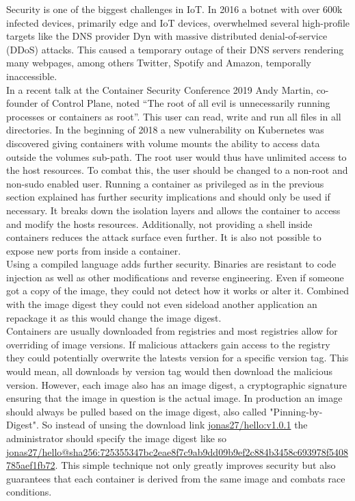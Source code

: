 Security is one of the biggest challenges in IoT. In 2016 a botnet with over 600k infected devices, primarily edge and IoT devices, overwhelmed several high-profile targets like the DNS provider Dyn with massive distributed denial-of-service (DDoS) attacks. This caused a temporary outage of their DNS servers rendering many webpages, among others  Twitter, Spotify and Amazon, temporally inaccessible. \\
In a recent talk at the Container Security Conference 2019 Andy Martin, co-founder of Control Plane, noted ``The root of all evil is unnecessarily running processes or containers as root''\cite{RootlessContainerSecurityTalk0:online}. This user can read, write and run all files in all directories. In the beginning of 2018 a new vulnerability on Kubernetes was discovered giving containers with volume mounts the ability to access data outside the volumes sub-path. The root user would thus have unlimited access to the host resources. To combat this, the user should be changed to a non-root and non-sudo enabled user. Running a container as privileged as in the previous section explained has further security implications and should only be used if necessary. It breaks down the isolation layers and allows the container to access and modify the hosts resources. Additionally, not providing a shell inside containers reduces the attack surface even further. It is also not possible to expose new ports from inside a container.\\
Using a compiled language adds further security. Binaries are resistant to code injection as well as other modifications and reverse engineering. Even if someone got a copy of the image, they could not detect how it works or alter it. Combined with the image digest they could not even sideload another application an repackage it as this would change the image digest. \\
Containers are usually downloaded from registries and most registries allow for overriding of image versions. If malicious attackers gain access to the registry they could potentially overwrite the latests version for a specific version tag. This would mean, all downloads by version tag would then download the malicious version. However, each image also has an image digest, a cryptographic signature ensuring that the image in question is the actual image. In production an image should always be pulled based on the image digest, also called "Pinning-by-Digest". So instead of unsing the download link \url{jonas27/hello:v1.0.1} the administrator should specify the image digest like so \url{jonas27/hello@sha256:725355347bc2eae8f7c9ab9dd09b9ef2c884b3458c693978f5408785aef1fb72}. This simple technique not only greatly improves security but also guarantees that each container is derived from the same image and combats race conditions.\\


